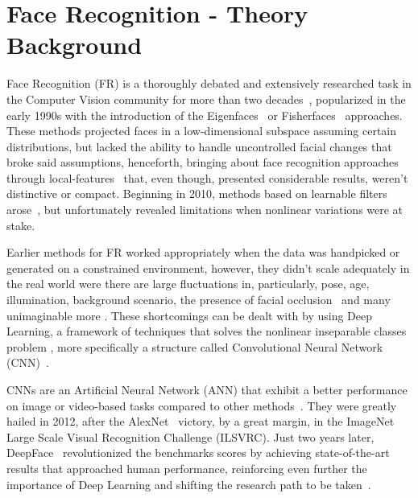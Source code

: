 \documentclass[class=report, crop=false, a4paper, 12pt]{standalone}
\begin{document}
\newpage

\section{Face Recognition - Theory Background}
Face Recognition (FR) is a thoroughly debated and extensively researched task in the Computer Vision community for more than two decades~\autocite{ranjanDeepLearningUnderstanding2018}, popularized in the early 1990s with the introduction of the Eigenfaces~\autocite{turkEigenfacesRecognition1991} or Fisherfaces~\autocite{p.n.belhumeurEigenfacesVsFisherfaces1997} approaches. These methods projected faces in a low-dimensional subspace assuming certain distributions, but lacked the ability to handle uncontrolled facial changes that broke said assumptions, henceforth, bringing about face recognition approaches through local-features~\autocite{chengjunliuGaborFeatureBased2002, ahonenFaceDescriptionLocal2006} that, even though, presented considerable results, weren't distinctive or compact. Beginning in 2010, methods based on learnable filters arose~\autocite{z.caoFaceRecognitionLearningbased2010,leiLearningDiscriminantFace2014}, but unfortunately revealed limitations when nonlinear variations were at stake.

\par Earlier methods for FR worked appropriately when the data was handpicked or generated on a constrained environment, however, they didn't scale adequately in the real world were there are large fluctuations in, particularly, pose, age, illumination, background scenario, the presence of facial occlusion~\autocite{ranjanDeepLearningUnderstanding2018} and many unimaginable more \autocite{kalkaIJBIARPAJanus2018}. These shortcomings can be dealt with by using Deep Learning, a framework of techniques that solves the nonlinear inseparable classes problem , more specifically a structure called Convolutional Neural Network (CNN)~\autocite{wangDeepFaceRecognition2021}. 

\par CNNs are an Artificial Neural Network (ANN) that exhibit a better performance on image or video-based tasks compared to other methods~\autocite{lecunGradientBasedLearningApplied1998}. They were greatly hailed in 2012, after the AlexNet~\autocite{krizhevskyImageNetClassificationDeep2012} victory, by a great margin, in the ImageNet Large Scale Visual Recognition Challenge (ILSVRC). Just two years later, DeepFace~\autocite{taigmanDeepFaceClosingGap2014} revolutionized the benchmarks scores by achieving state-of-the-art results that approached human performance, reinforcing even further the importance of Deep Learning and shifting the research path to be taken~\autocite{wangDeepFaceRecognition2021}.
\end{document}
